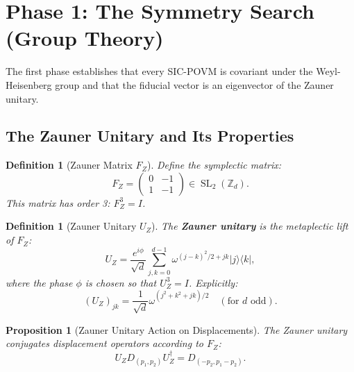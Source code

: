 \documentclass[a4paper,11pt]{article}
\newtheorem{definition}[theorem]{Definition}
\newtheorem{proposition}[theorem]{Proposition}
\DeclareMathOperator{\SL}{SL}
\newcommand{\Z}{\mathbb{Z}}
\begin{document}
\section{Phase 1: The Symmetry Search (Group Theory)}

The first phase establishes that every SIC-POVM is covariant under the Weyl-Heisenberg group and that the fiducial vector is an eigenvector of the Zauner unitary.

\subsection{The Zauner Unitary and Its Properties}

\begin{definition}[Zauner Matrix $F_Z$]
Define the symplectic matrix:
\begin{equation}
F_Z = \begin{pmatrix} 0 & -1 \\ 1 & -1 \end{pmatrix} \in \SL_2(\Z_d).
\end{equation}
This matrix has order 3: $F_Z^3 = I$.
\end{definition}

\begin{definition}[Zauner Unitary $U_Z$]
The \textbf{Zauner unitary} is the metaplectic lift of $F_Z$:
\begin{equation}
U_Z = \frac{e^{i\phi}}{\sqrt{d}} \sum_{j,k=0}^{d-1} \omega^{(j-k)^2/2 + jk} |j\rangle\langle k|,
\end{equation}
where the phase $\phi$ is chosen so that $U_Z^3 = I$. Explicitly:
\begin{equation}
(U_Z)_{jk} = \frac{1}{\sqrt{d}} \omega^{(j^2 + k^2 + jk)/2} \quad (\text{for } d \text{ odd}).
\end{equation}
\end{definition}

\begin{proposition}[Zauner Unitary Action on Displacements]\label{prop:zauner-action}
The Zauner unitary conjugates displacement operators according to $F_Z$:
\begin{equation}
U_Z D_{(p_1, p_2)} U_Z^\dagger = D_{(-p_2, p_1 - p_2)}.
\end{equation}
\end{proposition}
\end{document}
